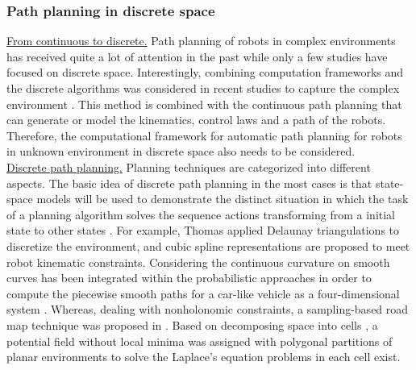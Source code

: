 \subsubsection{Path planning in discrete space}
\noindent\uline{From continuous to discrete.} Path planning of robots in complex environments has received quite a lot of attention in the past while only a few studies have focused on discrete space. Interestingly, combining computation frameworks and the discrete algorithms was considered in recent studies to capture the complex environment \cite*{Belta_2005_Discrete_MP}. 
This method is combined with the continuous path planning \cite{Mitchell03_ContinuousPathPlanning} that can generate or model the kinematics, control laws and a path of the robots. Therefore, the computational framework for automatic path planning for robots in unknown environment in discrete space also needs to be considered.\\




\noindent\uline{Discrete path planning.} Planning techniques are categorized into different aspects. The basic idea of discrete path planning in the most cases is that state-space models will be used to demonstrate the distinct situation in which the task of a planning algorithm solves the sequence actions transforming from a initial state to other states \cite{LaValle06_PlanningAlgorithm}.
For example, Thomas \cite*{Thomas_2003_Trajectory} applied Delaunay triangulations to discretize the environment, and cubic spline representations are proposed to meet robot kinematic constraints.
Considering the continuous curvature on smooth curves has been integrated within the probabilistic approaches in order to compute the piecewise smooth paths for a car-like vehicle as a four-dimensional system \cite*{Lamiraux_2001_Smooth_MP}. Whereas, dealing with nonholonomic constraints, a sampling-based road map technique was proposed in \cite*{Cheng_2001_RRT_trajectory}. Based on decomposing space into cells \cite*{Conner_2003_Potential_Func}, a potential field without local minima was assigned with polygonal partitions of planar environments to solve the Laplace's equation problems in each cell exist.\\



